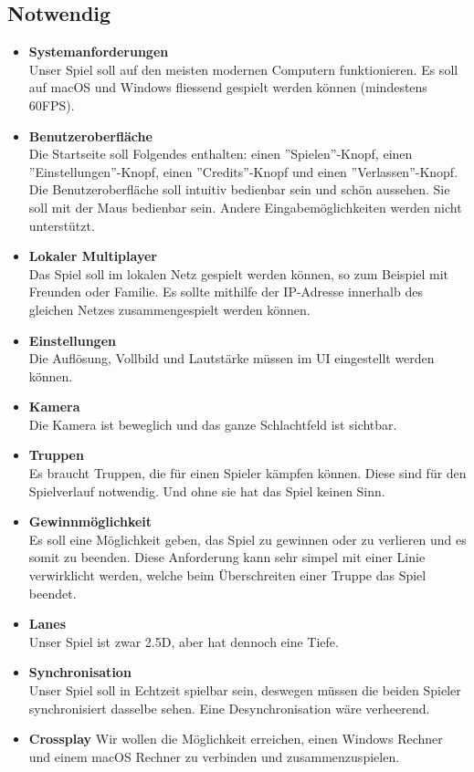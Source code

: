 \subsection{Notwendig}
\begin{itemize}
    \item \textbf{Systemanforderungen} \\
        Unser Spiel soll auf den meisten modernen Computern funktionieren. Es soll auf macOS und
        Windows fliessend gespielt werden können (mindestens 60FPS).
    \item \textbf{Benutzeroberfläche} \\
        Die Startseite soll Folgendes enthalten: einen ''Spielen''-Knopf, einen ''Einstellungen''-Knopf, einen
        ''Credits''-Knopf und einen ''Verlassen''-Knopf. Die Benutzeroberfläche soll intuitiv bedienbar sein und
        schön aussehen. Sie soll mit der Maus bedienbar sein. Andere Eingabemöglichkeiten
        werden nicht unterstützt.
    \item \textbf{Lokaler Multiplayer} \\
        Das Spiel soll im lokalen Netz gespielt werden können, so zum Beispiel mit Freunden oder Familie.
        Es sollte mithilfe der IP-Adresse innerhalb des gleichen Netzes zusammengespielt werden können.
    \item \textbf{Einstellungen} \\
        Die Auflösung, Vollbild und Lautstärke müssen im UI eingestellt werden können.
    \item \textbf{Kamera} \\
        Die Kamera ist beweglich und das ganze Schlachtfeld ist sichtbar.
    \item \textbf{Truppen} \\
        Es braucht Truppen, die für einen Spieler kämpfen können. Diese sind für den Spielverlauf notwendig.
        Und ohne sie hat das Spiel keinen Sinn.
    \item \textbf{Gewinnmöglichkeit} \\
        Es soll eine Möglichkeit geben, das Spiel zu gewinnen oder zu verlieren und es somit zu beenden. Diese Anforderung kann sehr simpel
        mit einer Linie verwirklicht werden, welche beim Überschreiten einer Truppe das Spiel beendet.
    \item \textbf{Lanes} \\
        Unser Spiel ist zwar 2.5D, aber hat dennoch eine Tiefe.
    \item \textbf{Synchronisation} \\
        Unser Spiel soll in Echtzeit spielbar sein, deswegen müssen die beiden Spieler synchronisiert dasselbe sehen. Eine Desynchronisation wäre verheerend. 
    \item \textbf{Crossplay}
        Wir wollen die Möglichkeit erreichen, einen Windows Rechner und einem macOS Rechner zu verbinden und zusammenzuspielen.
\end{itemize}

